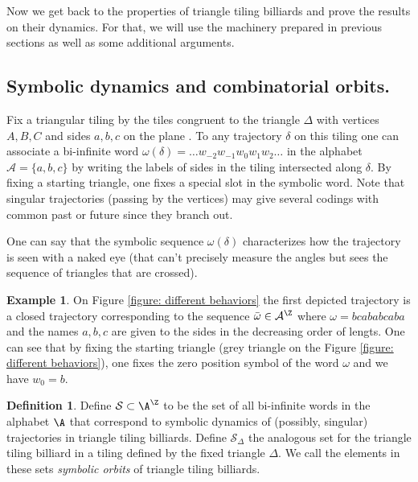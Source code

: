 \documentclass[12pt]{article}
\theoremstyle{definition}
\newtheorem{definition}{Definition}
\newtheorem*{example}{Example}
\begin{document}
Now we get back to the properties of triangle tiling billiards and 
prove the results on their dynamics. For that, we will use the machinery prepared in previous sections as well as some additional arguments.

\subsection{Symbolic dynamics and combinatorial orbits.}\label{subs:definition_HW}

Fix a triangular tiling by the tiles congruent to the triangle $\Delta$ with vertices $A,B,C$ and sides $a,b,c$  on the plane . To any trajectory $\delta$ on this tiling one can associate a bi-infinite word $\omega(\delta)= \ldots w_{-2} w_{-1} w_0 w_1 w_2 \ldots $ in the alphabet $\mathcal{A}=\{a,b,c\}$ by writing the labels of sides in the tiling intersected along $\delta$. By fixing a starting triangle, one fixes a special slot in the symbolic word. Note that singular trajectories (passing by the vertices) may give  several codings with common past or future since they branch out.

One can say that the symbolic sequence $\omega(\delta)$ characterizes how the trajectory is seen with a naked eye (that can't precisely measure the angles but sees the sequence of triangles that are crossed). 

\begin{example}
On Figure \ref{figure: different behaviors} the first depicted trajectory is a closed trajectory corresponding to the sequence $\bar{\omega} \in \mathcal{A}^\Z$ where $\omega=bcababcaba$ and the names $a,b,c$ are given to the sides in the decreasing order of lengts. One can see that by fixing the starting triangle (grey triangle on the Figure \ref{figure: different behaviors}), one fixes the zero position symbol of the word $\omega$ and we have $w_0=b$.
\end{example}

\begin{definition}
Define $\mathcal{S} \subset \A^{\Z}$ to be the set of all bi-infinite words in the alphabet $\A$ that correspond to symbolic dynamics of (possibly, singular) trajectories in triangle tiling billiards. Define ${\mathcal{S}}_{\Delta}$ the analogous set for the triangle tiling billiard in a tiling defined by the fixed triangle $\Delta$. We call the elements in these sets \emph{symbolic orbits} of triangle tiling billiards.
\end{definition}
\end{document}
